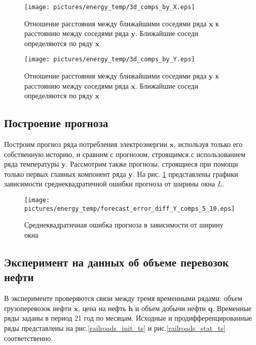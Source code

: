 \documentclass[14pt]{article}
\newcommand{\bh}{\mathbf{h}}
\newcommand{\bq}{\mathbf{q}}
\newcommand{\bx}{\mathbf{x}}
\newcommand{\by}{\mathbf{y}}
\begin{document}
\begin{figure}[H]
\begin{center}
\texttt{[image: pictures/energy\_temp/3d\_comps\_by\_X.eps]}
\vspace{-5mm}
\caption{Отношение расстояния между ближайшими соседями ряда $\bx$ к расстоянию между соседями ряда $\by$. Ближайшие соседи определяются по ряду $\bx$}
\end{center}
\end{figure}

\begin{figure}[H]
\begin{center}
\texttt{[image: pictures/energy\_temp/3d\_comps\_by\_Y.eps]}
\vspace{-5mm}
\caption{Отношение расстояния между ближайшими соседями ряда $\by$ к расстоянию между соседями ряда $\bx$. Ближайшие соседи определяются по ряду $\bx$}
\end{center}
\end{figure}

\subsection{Построение прогноза}
Построим прогноз ряда потребления электроэнергии $\bx$, используя только его собственную историю, и сравним с прогнозом, строящимся с использованием ряда температуры $\by$.  Рассмотрим также прогнозы, строящиеся при помощи только первых главных компонент ряда $\by$.
На рис. \ref{mse_energy} представлены графики зависимости среднеквадратичной ошибки прогноза от ширины окна $L$. 

\begin{figure}[H]
\begin{center}
\texttt{[image: pictures/energy\_temp/forecast\_error\_diff\_Y\_comps\_5\_10.eps]}
\caption{Среднеквадратичная ошибка прогноза в зависимости от ширину окна}
\label{mse_energy}
\end{center}
\end{figure}



\subsection{Эксперимент на данных об объеме перевозок нефти}
В эксперименте проверяются связи между тремя временными рядами: объем грузоперевозок нефти $\bx$, цена на нефть $\bh$ и объем добычи нефти $\bq$. 
Временные ряды заданы в период 21 год по месяцам. 
Исходные и продифференцированные ряды представлены на рис.\ref{railroads_init_ts} и рис.\ref{railroads_stat_ts} соответственно.  
\end{document}
